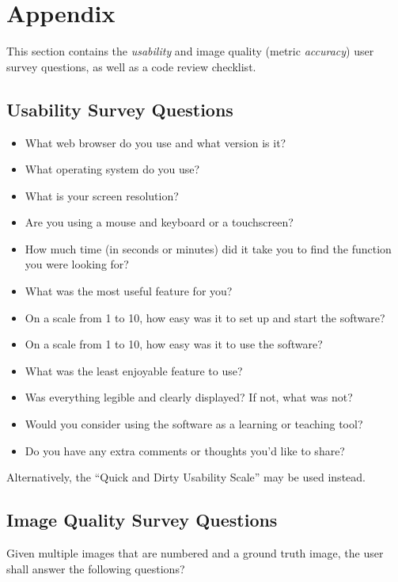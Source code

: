 \documentclass[12pt, titlepage]{article}
\begin{document}



\newpage

\section{Appendix}

This section contains the \textit{usability} and image quality (metric \textit{accuracy}) 
user survey questions, as well as a code review checklist.

\subsection{Usability Survey Questions} \label{survey_usability}

\begin{itemize}
  \item{What web browser do you use and what version is it?}
  \item{What operating system do you use?}
  \item{What is your screen resolution?}
  \item{Are you using a mouse and keyboard or a touchscreen?}
  \item{How much time (in seconds or minutes) did it take you to find the function you were looking for?}
  \item{What was the most useful feature for you?}
  \item{On a scale from 1 to 10, how easy was it to set up and start the software?}
  \item{On a scale from 1 to 10, how easy was it to use the software?}
  \item{What was the least enjoyable feature to use?}
  \item{Was everything legible and clearly displayed? If not, what was not?}
  \item{Would you consider using the software as a learning or teaching tool?}
  \item{Do you have any extra comments or thoughts you'd like to share?}
\end{itemize}

\noindent Alternatively, the ``Quick and Dirty Usability Scale'' \cite{qnd_usability} may be used
instead.

\subsection{Image Quality Survey Questions} \label{survey_metric}
Given multiple images that are numbered and a ground truth image, 
the user shall answer the following questions?
\end{document}
